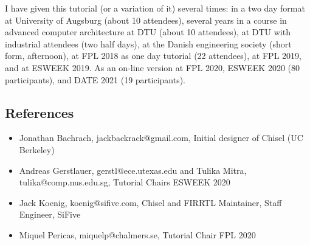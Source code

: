 \documentclass{article}
\begin{document}


I have given this tutorial (or a variation of it) several times:
in a two day format at University of Augsburg (about 10 attendees), several years
in a course in advanced computer architecture at DTU (about 10 attendees), at DTU with industrial attendees
(two half days), at the Danish engineering society (short form, afternoon),
at FPL 2018 as one day tutorial (22 attendees), at FPL 2019, and at ESWEEK 2019.
As an on-line version at FPL 2020, ESWEEK 2020 (80 participants), and DATE 2021 (19 participants).


\subsection*{References}

\begin{itemize}
\item Jonathan Bachrach, jackbackrack@gmail.com, Initial designer of Chisel (UC Berkeley)
\item Andreas Gerstlauer, gerstl@ece.utexas.edu and Tulika Mitra, tulika@comp.nus.edu.sg, Tutorial Chairs ESWEEK 2020
\item Jack Koenig, koenig@sifive.com, Chisel and FIRRTL Maintainer, Staff Engineer, SiFive
\item Miquel Pericas, miquelp@chalmers.se, Tutorial Chair FPL 2020
\end{itemize}
\end{document}
